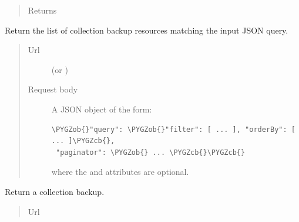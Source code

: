 \documentclass[letterpaper,10pt,english]{sphinxmanual}
\def\PYGZob{\char`\{}
\def\PYGZcb{\char`\}}
\begin{document}
\begin{fulllineitems}
\begin{fulllineitems}
\begin{quote}
\begin{description}
\item[{Returns}] \leavevmode
{}

\end{description}\end{quote}

\end{fulllineitems}


\begin{fulllineitems}
\label{api:onlinelinguisticdatabase.controllers.collectionbackups.CollectionbackupsController.search}
Return the list of collection backup resources matching the input
JSON query.
\begin{quote}\begin{description}
\item[{Url }] \leavevmode
{} (or )

\item[{Request body}] \leavevmode
A JSON object of the form:

\begin{Verbatim}[commandchars=\\\{\}]
\PYGZob{}"query": \PYGZob{}"filter": [ ... ], "orderBy": [ ... ]\PYGZcb{},
 "paginator": \PYGZob{} ... \PYGZcb{}\PYGZcb{}
\end{Verbatim}

where the  and  attributes are optional.

\end{description}\end{quote}

\end{fulllineitems}


\begin{fulllineitems}
\label{api:onlinelinguisticdatabase.controllers.collectionbackups.CollectionbackupsController.show}
Return a collection backup.
\begin{quote}\begin{description}
\item[{Url }] \leavevmode
{}


\end{description}
\end{quote}
\end{fulllineitems}
\end{fulllineitems}
\end{document}
